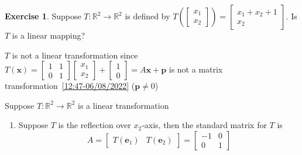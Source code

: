 \documentclass{beamer}
\theoremstyle{definition}
\newtheorem{exercise}[theorem]{Exercise}
\theoremstyle{remark}
\newcounter{saveenumi}
\newcommand{\seti}{\setcounter{saveenumi}{\value{enumi}}}
\begin{document}
\begin{frame}[t]
\begin{exercise}
Suppose $T:\mathbb R^2\to\mathbb R^2$ is defined by $T\left(\begin{bmatrix}
x_1\\x_2
\end{bmatrix}\right)=\begin{bmatrix}
x_1+x_2+1\\
x_2
\end{bmatrix}$. Is $T$ is a linear mapping?
\end{exercise}
\pause
\begin{solution}
$T$ is not a linear transformation since
$T(\mathbf x)=\begin{bmatrix}
1&1\\0&1
\end{bmatrix}\begin{bmatrix}
x_1\\x_2
\end{bmatrix}+\begin{bmatrix}
1\\0
\end{bmatrix}=A\mathbf x+\mathbf p$ is not a matrix transformation~\eqref{12:47-06/08/2022} ($\mathbf p\neq0$)
\end{solution}
\end{frame}

\begin{frame}[t]
\begin{example}\label{10:10-06/09/2022}
Suppose $T:\mathbb R^2\to\mathbb R^2$ is a linear transformation
\begin{enumerate}
\item Suppose $T$ is the reflection over $x_2$-axis, then the standard matrix for $T$ is\pause
\[
A=\begin{bmatrix}
T(\mathbf e_1)&T(\mathbf e_2)
\end{bmatrix}=\begin{bmatrix}
-1&0\\
0&1
\end{bmatrix}
\]
\begin{center}
\end{center}
\seti
\end{enumerate}
\end{example}
\end{frame}
\end{document}
